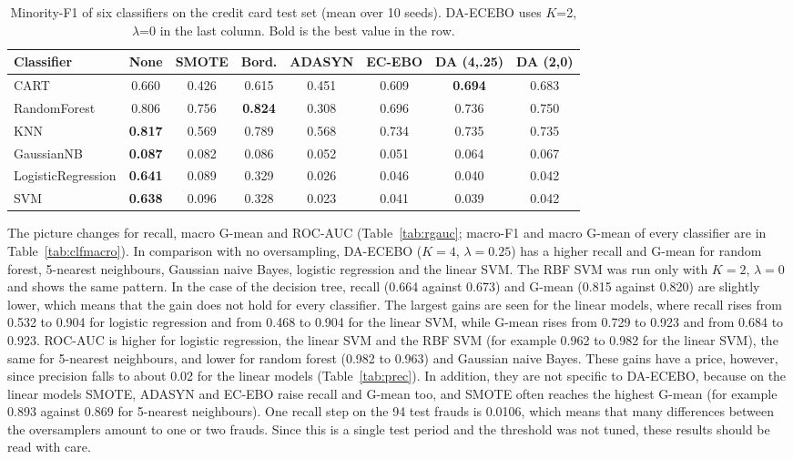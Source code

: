 \documentclass[preprint,10pt]{elsarticle}
\begin{document}
\begin{table}[!htbp]
\centering\small
\caption{Minority-F1 of six classifiers on the credit card test set (mean over 10 seeds). DA-ECEBO uses $K$=2, $\lambda$=0 in the last column. Bold is the best value in the row.}\label{tab:f1clf}
\begin{tabular}{lccccccc}
\toprule
Classifier & None & SMOTE & Bord. & ADASYN & EC-EBO & DA (4,.25) & DA (2,0)\\
\midrule
CART & 0.660 & 0.426 & 0.615 & 0.451 & 0.609 & \textbf{0.694} & 0.683\\
RandomForest & 0.806 & 0.756 & \textbf{0.824} & 0.308 & 0.696 & 0.736 & 0.750\\
KNN & \textbf{0.817} & 0.569 & 0.789 & 0.568 & 0.734 & 0.735 & 0.735\\
GaussianNB & \textbf{0.087} & 0.082 & 0.086 & 0.052 & 0.051 & 0.064 & 0.067\\
LogisticRegression & \textbf{0.641} & 0.089 & 0.329 & 0.026 & 0.046 & 0.040 & 0.042\\
SVM & \textbf{0.638} & 0.096 & 0.328 & 0.023 & 0.041 & 0.039 & 0.042\\
\bottomrule
\end{tabular}
\end{table}

The picture changes for recall, macro G-mean and ROC-AUC (Table~\ref{tab:rgauc}; macro-F1 and macro G-mean of every classifier are in Table~\ref{tab:clfmacro}). In comparison with no oversampling, DA-ECEBO ($K=4$, $\lambda=0.25$) has a higher recall and G-mean for random forest, 5-nearest neighbours, Gaussian naive Bayes, logistic regression and the linear SVM. The RBF SVM was run only with $K=2$, $\lambda=0$ and shows the same pattern. In the case of the decision tree, recall (0.664 against 0.673) and G-mean (0.815 against 0.820) are slightly lower, which means that the gain does not hold for every classifier. The largest gains are seen for the linear models, where recall rises from 0.532 to 0.904 for logistic regression and from 0.468 to 0.904 for the linear SVM, while G-mean rises from 0.729 to 0.923 and from 0.684 to 0.923. ROC-AUC is higher for logistic regression, the linear SVM and the RBF SVM (for example 0.962 to 0.982 for the linear SVM), the same for 5-nearest neighbours, and lower for random forest (0.982 to 0.963) and Gaussian naive Bayes. These gains have a price, however, since precision falls to about 0.02 for the linear models (Table~\ref{tab:prec}). In addition, they are not specific to DA-ECEBO, because on the linear models SMOTE, ADASYN and EC-EBO raise recall and G-mean too, and SMOTE often reaches the highest G-mean (for example 0.893 against 0.869 for 5-nearest neighbours). One recall step on the 94 test frauds is 0.0106, which means that many differences between the oversamplers amount to one or two frauds. Since this is a single test period and the threshold was not tuned, these results should be read with care.
\end{document}
